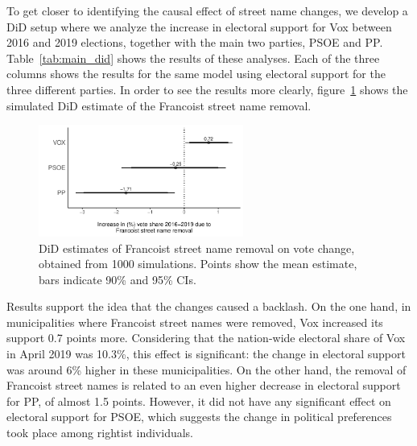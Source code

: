 \documentclass[12pt, notitlepage]{article}
\begin{document}
To get closer to identifying the causal effect of street name changes, we develop a DiD setup where we analyze the increase in electoral support for Vox between 2016 and 2019 elections,%
together with the main two parties, PSOE and PP.
Table~\ref{tab:main_did} shows the results of these analyses.
Each of the three columns shows the results for the same model using electoral support for the three different parties.
In order to see the results more clearly, figure~\ref{fig:main_did} shows the simulated DiD estimate of the Francoist street name removal.



\begin{figure}[htb!]
\centering

  \includegraphics[width = 0.6\textwidth]{img/DiD_estimates}

  \caption{DiD estimates of Francoist street name removal on vote change, obtained from 1000 simulations. Points show the mean estimate, bars indicate 90\% and 95\% CIs.}\label{fig:main_did}

\end{figure}

Results support the idea that the changes caused a backlash.
On the one hand, in municipalities where Francoist street names were removed, Vox increased its support 0.7 points more.
Considering that the nation-wide electoral share of Vox in April 2019 was 10.3\%, this effect is significant: the change in electoral support was around 6\% higher in these municipalities.
On the other hand, the removal of Francoist street names is related to an even higher decrease in electoral support for PP, of almost 1.5 points.
However, it did not have any significant effect on electoral support for PSOE, which suggests the change in political preferences took place among rightist individuals.
\end{document}

